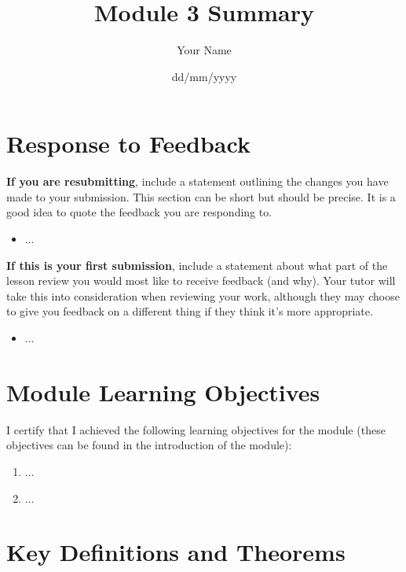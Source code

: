 \documentclass[
  12pt,
  a4paper,
]{article}
\title{Module 3 Summary}
\author{Your Name}
\date{dd/mm/yyyy}
\begin{document}
\maketitle



\section*{Response to Feedback} 

\textbf{If you are resubmitting}, include a statement outlining the changes you have made to your submission. This section can be short but should be precise. It is a good idea to quote the feedback you are responding to.
\begin{itemize}
    \item ... %
\end{itemize}

\noindent
\textbf{If this is your first submission}, include a statement about what part of the lesson review you would most like to receive feedback (and why). Your tutor will take this into consideration when reviewing your work, although they may choose to give you feedback on a different thing if they think it’s more appropriate. 
\begin{itemize}
    \item ... %
\end{itemize}

\section*{Module Learning Objectives}
I certify that I achieved the following learning objectives for the module (these objectives can be found in the introduction of the module):
\begin{enumerate}
    \item ...
    \item ...
\end{enumerate}

\vspace{2cm}

\section*{Key Definitions and Theorems}

\end{document}
